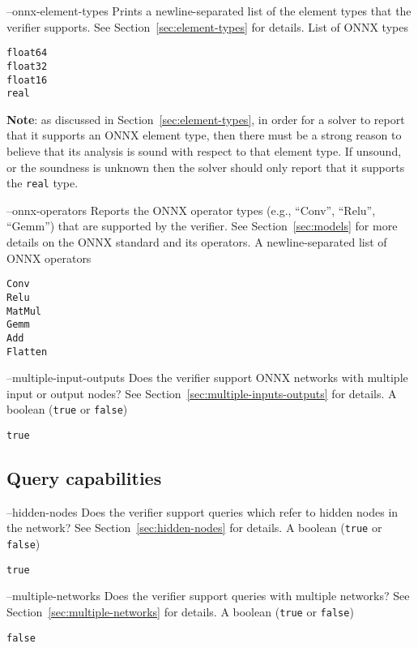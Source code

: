 \clOutputOption
{--onnx-element-types}
{Prints a newline-separated list of the element types that the verifier supports. See Section~\ref{sec:element-types} for details.}
{List of ONNX types}
\begin{lstlisting}[style=bash]
%*\exampleVerifier* supports --onnx-element-types
float64
float32
float16
real
\end{lstlisting}
\textbf{Note}: as discussed in Section~\ref{sec:element-types}, in order for a solver to report that it supports an ONNX element type, then there must be a strong reason to believe that its analysis is sound with respect to that element type. If unsound, or the soundness is unknown then the solver should only report that it supports the \texttt{real} type.

\clOutputOption
{--onnx-operators}
{Reports the ONNX operator types (e.g., ``Conv'', ``Relu'', ``Gemm'') that are supported by the verifier. See Section~\ref{sec:models} for more details on the ONNX standard and its operators.}
{A newline-separated list of ONNX operators}
\begin{lstlisting}[style=bash]
%*\exampleVerifier* supports --onnx-operators
Conv
Relu
MatMul
Gemm
Add
Flatten
\end{lstlisting}

\clOutputOption
{--multiple-input-outputs}
{Does the verifier support ONNX networks with multiple input or output nodes? See Section~\ref{sec:multiple-inputs-outputs} for details.}
{A boolean (\texttt{true} or \texttt{false})}
\begin{lstlisting}[style=bash]
%*\exampleVerifier* supports --multiple-inputs-outputs
true
\end{lstlisting}

\subsection{Query capabilities}

\clOutputOption
{--hidden-nodes}
{Does the verifier support queries which refer to hidden nodes in the network? See Section~\ref{sec:hidden-nodes} for details.}
{A boolean (\texttt{true} or \texttt{false})}
\begin{lstlisting}[style=bash]
%*\exampleVerifier* supports --hidden-nodes
true
\end{lstlisting}

\clOutputOption
{--multiple-networks}
{Does the verifier support queries with multiple networks? See Section~\ref{sec:multiple-networks} for details.}
{A boolean (\texttt{true} or \texttt{false})}
\begin{lstlisting}[style=bash]
%*\exampleVerifier* supports --multiple-networks
false
\end{lstlisting}

